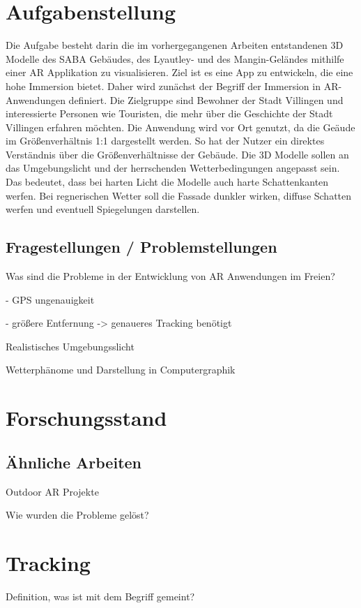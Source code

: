 

\section{Aufgabenstellung}
Die Aufgabe besteht darin die im vorhergegangenen Arbeiten entstandenen 3D Modelle des SABA Gebäudes, des Lyautley- und des Mangin-Geländes mithilfe einer AR Applikation zu visualisieren. Ziel ist es eine App zu entwickeln, die eine hohe Immersion bietet. Daher wird zunächst der Begriff der Immersion in AR-Anwendungen definiert. Die Zielgruppe sind Bewohner der Stadt Villingen und interessierte Personen wie Touristen, die mehr über die Geschichte der Stadt Villingen erfahren möchten. Die Anwendung wird vor Ort genutzt, da die Geäude im Größenverhältnis 1:1 dargestellt werden. So hat der Nutzer ein direktes Verständnis über die Größenverhältnisse der Gebäude. Die 3D Modelle sollen an das Umgebungslicht und der herrschenden Wetterbedingungen angepasst sein. Das bedeutet, dass bei harten Licht die Modelle auch harte Schattenkanten werfen. Bei regnerischen Wetter soll die Fassade dunkler wirken, diffuse Schatten werfen und eventuell Spiegelungen darstellen.

\subsection{Fragestellungen / Problemstellungen}
Was sind die Probleme in der Entwicklung von AR Anwendungen im Freien?

- GPS ungenauigkeit

- größere Entfernung -> genaueres Tracking benötigt

Realistisches Umgebungsslicht

Wetterphänome und Darstellung in Computergraphik

\section{Forschungsstand}
\subsection{Ähnliche Arbeiten}
Outdoor AR Projekte

Wie wurden die Probleme gelöst?

\section{Tracking}
Definition, was ist mit dem Begriff gemeint?
